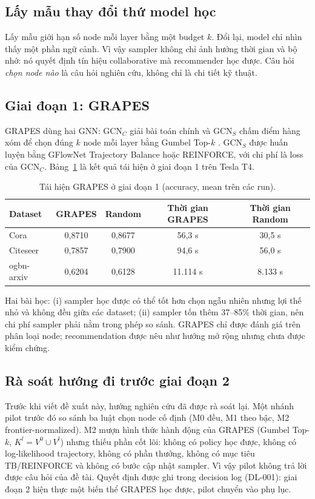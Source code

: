 \documentclass[11pt,a4paper]{article}
\begin{document}
\subsection{Lấy mẫu thay đổi thứ model học}
Lấy mẫu giới hạn số node mỗi layer bằng một budget $k$. Đổi lại, model chỉ nhìn thấy một phần ngữ cảnh. Vì vậy sampler không chỉ ảnh hưởng thời gian và bộ nhớ: nó quyết định tín hiệu collaborative mà recommender học được. Câu hỏi \emph{chọn node nào} là câu hỏi nghiên cứu, không chỉ là chi tiết kỹ thuật.

\subsection{Giai đoạn 1: GRAPES}
GRAPES \cite{grapes} dùng hai GNN: $\mathrm{GCN}_C$ giải bài toán chính và $\mathrm{GCN}_S$ chấm điểm hàng xóm để chọn đúng $k$ node mỗi layer bằng Gumbel Top-$k$ \cite{gumbeltopk}. $\mathrm{GCN}_S$ được huấn luyện bằng GFlowNet Trajectory Balance hoặc REINFORCE, với chi phí là loss của $\mathrm{GCN}_C$. Bảng~\ref{tab:phase1} là kết quả tái hiện ở giai đoạn 1 trên Tesla T4.

\begin{table}[h]
\centering\small
\caption{Tái hiện GRAPES ở giai đoạn 1 (accuracy, mean trên các run).}\label{tab:phase1}
\begin{tabular}{lcccc}
\toprule
Dataset & GRAPES & Random & Thời gian GRAPES & Thời gian Random \\
\midrule
Cora & 0,8710 & 0,8677 & 56,3 s & 30,5 s \\
Citeseer & 0,7857 & 0,7900 & 94,6 s & 56,0 s \\
ogbn-arxiv & 0,6204 & 0,6128 & 11.114 s & 8.133 s \\
\bottomrule
\end{tabular}
\end{table}

Hai bài học: (i) sampler học được có thể tốt hơn chọn ngẫu nhiên nhưng lợi thế nhỏ và không đều giữa các dataset; (ii) sampler tốn thêm 37--85\% thời gian, nên chi phí sampler phải nằm trong phép so sánh. GRAPES chỉ được đánh giá trên phân loại node; recommendation được nêu như hướng mở rộng nhưng chưa được kiểm chứng.

\subsection{Rà soát hướng đi trước giai đoạn 2}
Trước khi viết đề xuất này, hướng nghiên cứu đã được rà soát lại. Một nhánh pilot trước đó so sánh ba luật chọn node cố định (M0 đều, M1 theo bậc, M2 frontier-normalized). M2 mượn hình thức hành động của GRAPES (Gumbel Top-$k$, $K^l = V^0 \cup V^l$) nhưng thiếu phần cốt lõi: không có policy học được, không có log-likelihood trajectory, không có phần thưởng, không có mục tiêu TB/REINFORCE và không có bước cập nhật sampler. Vì vậy pilot không trả lời được câu hỏi của đề tài. Quyết định được ghi trong decision log (DL-001): giai đoạn 2 hiện thực một biến thể GRAPES học được, pilot chuyển vào phụ lục.
\end{document}
